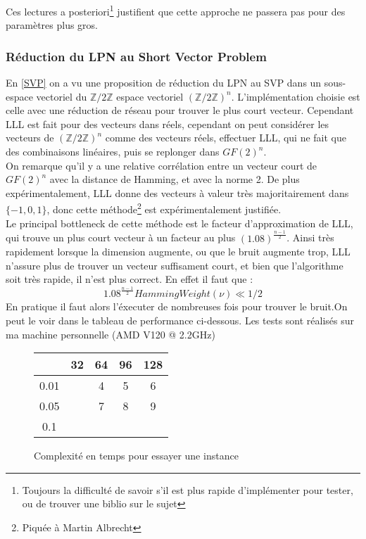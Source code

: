 \documentclass{article}		%
\theoremstyle{definition}
\theoremstyle{plain}
\theoremstyle{plain}
\theoremstyle{plain}
\theoremstyle{plain}
\begin{document}
Ces lectures a posteriori\footnote{Toujours la difficulté de savoir s'il
est plus rapide d'implémenter pour tester, ou de trouver une biblio sur
le sujet} justifient que cette approche ne passera pas pour
des paramètres plus gros. 

\subsubsection{Réduction du LPN au Short Vector Problem}\label{Impsvp}
En \ref{SVP} on a vu une proposition de réduction du LPN au SVP dans un
sous-espace vectoriel du $\mathbb{Z}/2\mathbb{Z}$ espace vectoriel
$(\mathbb{Z}/2\mathbb{Z})^n$. L'implémentation choisie est celle avec une
réduction de réseau pour trouver le plus court vecteur. Cependant LLL
est fait pour des vecteurs dans réels, cependant on peut considérer les
vecteurs de $(\mathbb{Z}/2\mathbb{Z})^n$ comme des vecteurs réels,
effectuer LLL, qui ne fait que des combinaisons linéaires, puis se
replonger dans $GF(2)^n$.
\\ 
On remarque qu'il y a une relative corrélation entre un vecteur court de
$GF(2)^n$ avec la distance de Hamming, et avec la norme 2. De plus
expérimentalement, LLL donne des vecteurs à valeur très majoritairement
dans $\{-1,0,1\}$, donc cette méthode\footnote{Piquée à Martin Albrecht}
est expérimentalement justifiée.
\\
Le principal bottleneck de cette méthode est le facteur d'approximation
de LLL, qui trouve un plus court vecteur à un facteur au plus 
$(1.08)^{\frac {n-1} {2}}$. Ainsi très rapidement lorsque la
dimension augmente, ou que le bruit augmente trop, LLL n'assure plus
de trouver
un vecteur suffisament court, et bien que l'algorithme soit
très rapide, il n'est plus correct.
En effet il faut que : $$1.08^{\frac {n-1} {2}}HammingWeight(\nu)\ll1/2
$$ 
 En pratique il faut alors l'éxecuter
de nombreuses fois pour trouver le bruit.On 
peut le voir dans le tableau de performance ci-dessous. Les tests sont
réalisés sur ma machine personnelle (AMD V120 @ 2.2GHz)
\\
\begin{figure}
\caption{Complexité en temps pour essayer une instance}
\begin{center}
\begin{tabular}{|c |c | c | c | c | }
\hline
   & 32 & 64 & 96 & 128 \\
\hline
 0.01  & &4 & 5 & 6 \\
\hline
  0.05 & &7 & 8 & 9 \\
\hline
 0.1& & & &\\
 \hline
 \end{tabular}
\end{center}
\end{figure}
\end{document}
